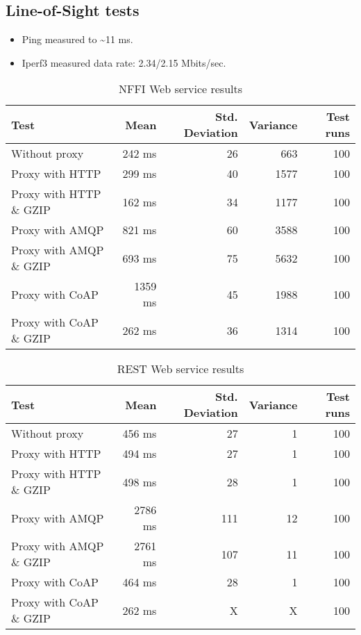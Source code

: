 \begin{appendices}
\section{Line-of-Sight tests}

\begin{itemize}
	\item Ping measured to \textasciitilde 11 ms.
	\item Iperf3 measured data rate: 2.34/2.15 Mbits/sec.
\end{itemize}

\begin{table}[H]
\begin{tabular}{| l | r | r | r | r |}
\hline
  \textbf{Test} & \textbf{Mean} & \textbf{Std. Deviation} & \textbf{Variance} & \textbf{Test runs}\\ \hline
  Without proxy & 242 ms & 26 & 663 & 100 \\ \hline
  Proxy with HTTP & 299 ms & 40 & 1577 & 100 \\ \hline
  Proxy with HTTP \& GZIP & 162 ms & 34 & 1177 & 100 \\ \hline
  Proxy with AMQP & 821 ms & 60 & 3588 & 100 \\ \hline
  Proxy with AMQP \& GZIP & 693 ms & 75 & 5632 & 100\\ \hline
  Proxy with CoAP & 1359 ms & 45 & 1988 & 100 \\ \hline
  Proxy with CoAP \& GZIP & 262 ms & 36 & 1314 & 100 \\ \hline
\end{tabular}
\caption{NFFI Web service results}
\end{table}


\begin{table}[H]
\begin{tabular}{| l | r | r | r | r |}
\hline
  \textbf{Test} & \textbf{Mean} & \textbf{Std. Deviation} & \textbf{Variance} & \textbf{Test runs}\\ \hline
  Without proxy & 456 ms & 27 & 1 & 100 \\ \hline
  Proxy with HTTP & 494 ms & 27 & 1 & 100 \\ \hline
  Proxy with HTTP \& GZIP & 498 ms & 28 & 1 & 100 \\ \hline
  Proxy with AMQP & 2786 ms & 111 & 12 & 100 \\ \hline
  Proxy with AMQP \& GZIP & 2761 ms & 107 & 11 & 100\\ \hline
  Proxy with CoAP & 464 ms & 28 & 1 & 100 \\ \hline
  Proxy with CoAP \& GZIP & 262 ms & X & X & 100 \\ \hline
\end{tabular}
\caption{REST Web service results}
\end{table}





\end{appendices}
